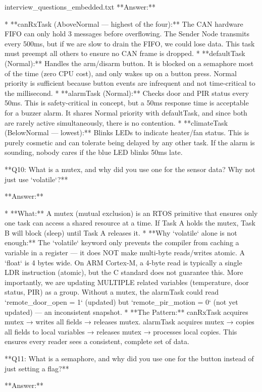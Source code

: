 \begin{filecontents*}{interview_questions_embedded.txt}
**Answer:**

* **canRxTask (AboveNormal — highest of the four):** The CAN hardware FIFO can only hold 3 messages before overflowing. The Sender Node transmits every 500ms, but if we are slow to drain the FIFO, we could lose data. This task must preempt all others to ensure no CAN frame is dropped.
* **defaultTask (Normal):** Handles the arm/disarm button. It is blocked on a semaphore most of the time (zero CPU cost), and only wakes up on a button press. Normal priority is sufficient because button events are infrequent and not time-critical to the millisecond.
* **alarmTask (Normal):** Checks door and PIR status every 50ms. This is safety-critical in concept, but a 50ms response time is acceptable for a buzzer alarm. It shares Normal priority with defaultTask, and since both are rarely active simultaneously, there is no contention.
* **climateTask (BelowNormal — lowest):** Blinks LEDs to indicate heater/fan status. This is purely cosmetic and can tolerate being delayed by any other task. If the alarm is sounding, nobody cares if the blue LED blinks 50ms late.

**Q10: What is a mutex, and why did you use one for the sensor data? Why not just use `volatile`?**

**Answer:**

* **What:** A mutex (mutual exclusion) is an RTOS primitive that ensures only one task can access a shared resource at a time. If Task A holds the mutex, Task B will block (sleep) until Task A releases it.
* **Why `volatile` alone is not enough:** The `volatile` keyword only prevents the compiler from caching a variable in a register — it does NOT make multi-byte reads/writes atomic. A `float` is 4 bytes wide. On ARM Cortex-M, a 4-byte read is typically a single LDR instruction (atomic), but the C standard does not guarantee this. More importantly, we are updating MULTIPLE related variables (temperature, door status, PIR) as a group. Without a mutex, the alarmTask could read `remote_door_open = 1` (updated) but `remote_pir_motion = 0` (not yet updated) — an inconsistent snapshot.
* **The Pattern:** canRxTask acquires mutex → writes all fields → releases mutex. alarmTask acquires mutex → copies all fields to local variables → releases mutex → processes local copies. This ensures every reader sees a consistent, complete set of data.

**Q11: What is a semaphore, and why did you use one for the button instead of just setting a flag?**

**Answer:**


\end{filecontents*}
